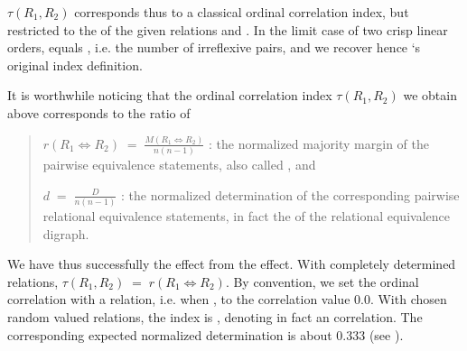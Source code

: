 \documentclass[a4paper,12pt,english]{sphinxhowto}
\begin{document}
\sphinxAtStartPar
\(\tau(R_1,R_2)\) corresponds thus to a classical ordinal correlation index, but restricted to the  of the given relations  and . In the limit case of two crisp linear orders,  equals , i.e. the number of irreflexive pairs, and we recover hence  ‘s original  index definition.

\sphinxAtStartPar
It is worthwhile noticing that the ordinal correlation index \(\tau(R_1,R_2)\) we obtain above corresponds to the ratio of
\begin{quote}

\sphinxAtStartPar
\(r(R_1 \Leftrightarrow R_2) \;=\; \frac{M(R_1 \Leftrightarrow R_2)}{n(n-1)}\) : the normalized majority margin of the pairwise  equivalence statements, also called , and

\sphinxAtStartPar
\(d \;=\; \frac{D}{n(n-1)}\) : the normalized determination of the corresponding pairwise relational equivalence statements, in fact the  of the relational equivalence digraph.
\end{quote}

\sphinxAtStartPar
We have thus successfully  the  effect from the  effect. With completely determined relations, \(\tau(R_1,R_2) \;=\; r(R_1 \Leftrightarrow R_2)\). By convention, we set the ordinal correlation with a  relation, i.e. when , to the  correlation value 0.0. With  chosen random \sphinxhyphen{}valued relations, the   index is , denoting in fact an  correlation. The corresponding expected normalized determination  is about 0.333 (see ).
\end{document}
